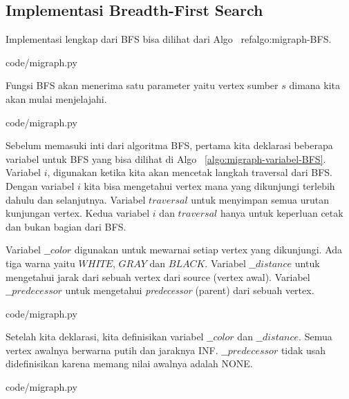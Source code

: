 \subsection{Implementasi Breadth-First Search}

Implementasi lengkap dari BFS bisa dilihat dari Algo ~ref{algo:migraph-BFS}.


                {code/migraph.py}

Fungsi BFS akan menerima satu parameter yaitu vertex sumber $s$ dimana kita akan mulai menjelajahi.


                {code/migraph.py}

Sebelum memasuki inti dari algoritma BFS, pertama kita deklarasi beberapa variabel untuk BFS yang bisa dilihat di Algo ~\ref{algo:migraph-variabel-BFS}. Variabel $i$, digunakan ketika kita akan mencetak langkah traversal dari BFS. Dengan variabel $i$ kita bisa mengetahui vertex mana yang dikunjungi terlebih dahulu dan selanjutnya. Variabel $traversal$ untuk menyimpan semua urutan kunjungan vertex. Kedua variabel $i$ dan $traversal$ hanya untuk keperluan cetak dan bukan bagian dari BFS. 

Variabel $\_\_color$ digunakan untuk mewarnai setiap vertex yang dikunjungi. Ada tiga warna yaitu $WHITE$, $GRAY$ dan $BLACK$. Variabel $\_\_distance$ untuk mengetahui jarak dari sebuah vertex dari source (vertex awal). Variabel $\_\_predecessor$ untuk mengetahui \textit{predecessor} (parent) dari sebuah vertex. 


                {code/migraph.py}

Setelah kita deklarasi, kita definisikan variabel $\_\_color$ dan $\_\_distance$. Semua vertex awalnya berwarna putih dan jaraknya INF. $\_\_predecessor$ tidak usah didefinisikan karena memang nilai awalnya adalah NONE.


                {code/migraph.py}

